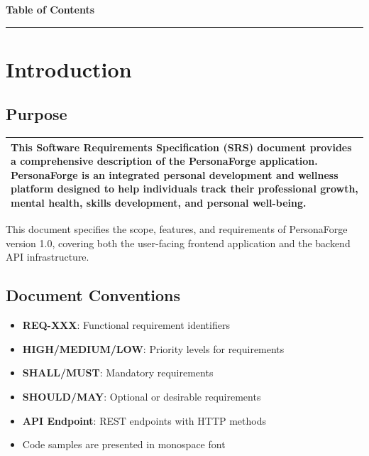 \documentclass[12pt,a4paper]{article}
\begin{document}
\newpage

\begin{center}
  {\color{deepblue}\LARGE\textbf{Table of Contents}}
  \vspace{1em}
  {\color{accentblue}\hrule}
\end{center}

\vspace{1em}

\tableofcontents

\newpage


\section{Introduction}

\subsection{Purpose}
\begin{tabular}{|p{\textwidth-2\tabcolsep}|}
\hline
\rowcolor{lightgray}
This Software Requirements Specification (SRS) document provides a comprehensive description of the PersonaForge application. PersonaForge is an integrated personal development and wellness platform designed to help individuals track their professional growth, mental health, skills development, and personal well-being. \\
\hline
\end{tabular}

\vspace{0.5em}

This document specifies the scope, features, and requirements of PersonaForge version 1.0, covering both the user-facing frontend application and the backend API infrastructure.

\subsection{Document Conventions}
\begin{itemize}
    \item \textbf{REQ-XXX}: Functional requirement identifiers
    \item \textbf{HIGH/MEDIUM/LOW}: Priority levels for requirements
    \item \textbf{SHALL/MUST}: Mandatory requirements
    \item \textbf{SHOULD/MAY}: Optional or desirable requirements
    \item \textbf{API Endpoint}: REST endpoints with HTTP methods
    \item Code samples are presented in monospace font
\end{itemize}
\end{document}
